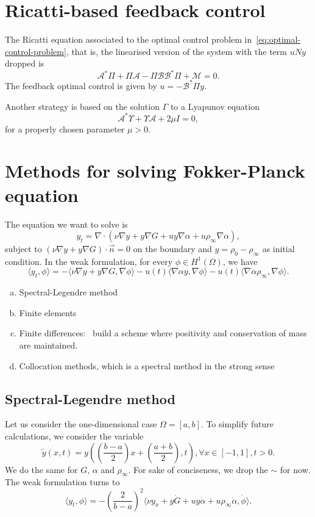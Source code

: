 \documentclass[12pt]{article}
\newcommand{\n}{\vec{n}}
\newcommand{\steady}{\rho_{\infty}}
\newcommand{\inner}[2]{\langle{} #1, #2 \rangle{}}
\theoremstyle{definition}
\begin{document}
\section{Ricatti-based feedback control}

The Ricatti equation associated to the optimal control problem in~\eqref{eq:optimal-control-problem}, that is, the linearised version of the system with the term $uNy$ dropped is
\[
\mathcal{A}^*\Pi + \Pi\mathcal{A} - \Pi\mathcal{B}\mathcal{B}^*\Pi + \mathcal{M} = 0.
\]
The feedback optimal control is given by $u = -\mathcal{B}^{*}\Pi y$.

Another strategy is based on the solution $\Gamma$ to a Lyapunov equation
\[
\mathcal{A}^* \Upsilon + \Upsilon \mathcal{A} + 2 \mu I = 0,   
\]
for a properly chosen parameter $\mu > 0$.

\section{Methods for solving Fokker-Planck equation}

The equation we want to solve is 
\[
y_t = \nabla \cdot (\nu \nabla y + y \nabla G + u y \nabla \alpha + u \steady \nabla \alpha),
\]
subject to $(\nu \nabla y + y \nabla G) \cdot \n = 0$ on the boundary and $y = \rho_0 - \steady$ as initial condition.
In the weak formulation, for every $\phi \in H^1(\Omega)$, we have
\[
\inner{y_t}{\phi} = -\inner{\nu \nabla y + y \nabla G}{\nabla \phi} - u(t)\inner{\nabla \alpha y}{\nabla \phi} - u(t)\inner{ \nabla \alpha \steady}{\nabla \phi}.
\]

\begin{enumerate}[(a)]
    \item Spectral-Legendre method
    \item Finite elements
    \item Finite differences:~\cite{chang1970practical} build a scheme where positivity and conservation of mass are maintained.
    \item Collocation methods, which is a spectral method in the strong sense
\end{enumerate}

\subsection{Spectral-Legendre method}

Let us consider the one-dimensional case $\Omega = [a,b]$.
To simplify future calculations, we consider the variable
\[
\tilde{y}(x,t) = y\left(\left(\frac{b-a}{2}\right)x + \left(\frac{a+b}{2}\right), t\right), \forall x \in [-1,1], t > 0.    
\]
We do the same for $G$, $\alpha$ and $\steady$. 
For sake of conciseness, we drop the $\sim$ for now.
The weak formulation turns to 
\[
\inner{y_t}{\phi} = - {\left(\frac{2}{b-a}\right)}^2\inner{\nu y_x + y \dot{G} + u y \dot{\alpha} + u\steady \dot{\alpha}}{\dot{\phi}}.
\]
\end{document}
